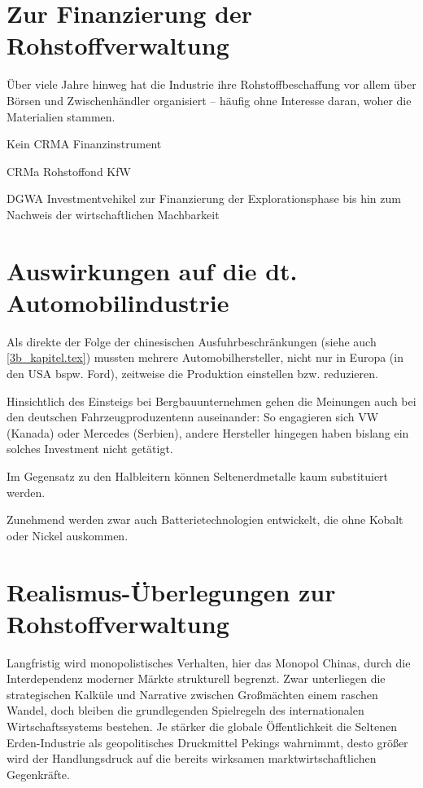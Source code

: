 \documentclass[12pt,a4paper,oneside]{book} %
\begin{document}
\section{Zur Finanzierung der Rohstoffverwaltung}

Über viele Jahre hinweg hat die Industrie ihre Rohstoffbeschaffung vor allem über Börsen und Zwischenhändler organisiert – häufig ohne Interesse daran, woher die Materialien stammen.\autocite{https://www.africa-business-guide.de/de/praxis/erfahrungen/schluesselrolle-afrikas-bedeutung-bei-den-kritischen-rohstoffen--1920084}

Kein CRMA Finanzinstrument

CRMa Rohstoffond KfW

DGWA Investmentvehikel zur Finanzierung der Explorationsphase bis hin zum Nachweis der wirtschaftlichen Machbarkeit

\section{Auswirkungen auf die dt. Automobilindustrie}



Als direkte der Folge der chinesischen Ausfuhrbeschränkungen (siehe auch \ref{3b_kapitel.tex}) mussten mehrere Automobilhersteller, nicht nur in Europa (in den USA bspw. Ford\autocite{Naughton_Bloomberg}), zeitweise die Produktion einstellen bzw. reduzieren.

Hinsichtlich des Einsteigs bei Bergbauunternehmen gehen die Meinungen auch bei den deutschen Fahrzeugproduzentenn auseinander: So engagieren sich VW (Kanada) oder Mercedes (Serbien), andere Hersteller hingegen haben bislang ein solches Investment nicht getätigt.

Im Gegensatz zu den Halbleitern können Seltenerdmetalle kaum substituiert werden.

Zunehmend werden zwar auch Batterietechnologien entwickelt, die ohne Kobalt oder Nickel auskommen.

\section{Realismus-Überlegungen zur Rohstoffverwaltung}

Langfristig wird monopolistisches Verhalten, hier das Monopol Chinas, durch die Interdependenz moderner Märkte strukturell begrenzt. Zwar unterliegen die strategischen Kalküle und Narrative zwischen Großmächten einem raschen Wandel, doch bleiben die grundlegenden Spielregeln des internationalen Wirtschaftssystems bestehen. Je stärker die globale Öffentlichkeit die Seltenen Erden-Industrie als geopolitisches Druckmittel Pekings wahrnimmt, desto größer wird der Handlungsdruck auf die bereits wirksamen marktwirtschaftlichen Gegenkräfte.
\end{document}
